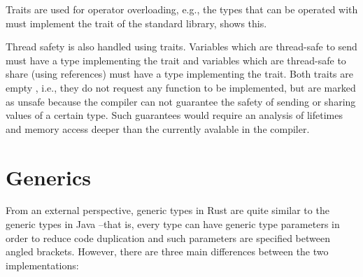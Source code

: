Traits are used for operator overloading, e.g., the types that can be operated
with \inrust{+} must implement the  trait of the standard library,
 shows this. 

Thread safety is also handled using traits. Variables which are thread-safe to
send must have a type implementing the  trait and variables which
are thread-safe to share (using references) must have a type implementing the
 trait. Both traits are empty , i.e., they do not request any
function to be implemented, but are marked as unsafe because the compiler can
not guarantee the safety of sending or sharing values of a certain type. Such
guarantees would require an analysis of lifetimes and memory access deeper than
the currently avalable in the compiler.

\section{Generics}
\label{sec:generics}

From an external perspective, generic types in Rust are quite similar to the
generic types in Java --that is, every type can have generic type parameters in
order to reduce code duplication and such parameters are specified between
angled brackets. However, there are three main differences between the two
implementations:

